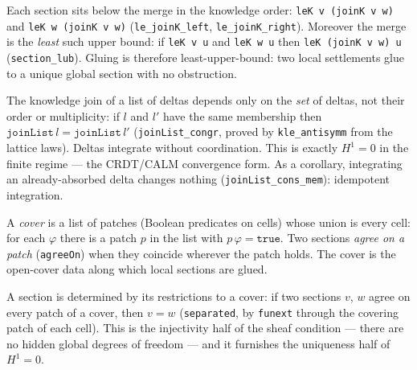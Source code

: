 \begin{lemma}\label{thm:section-lub}\leanok{}
Each section sits below the merge in the knowledge order: \texttt{leK v (joinK v w)} and \texttt{leK w (joinK v w)} (\texttt{le\_joinK\_left}, \texttt{le\_joinK\_right}). Moreover the merge is the \emph{least} such upper bound: if \texttt{leK v u} and \texttt{leK w u} then \texttt{leK (joinK v w) u} (\texttt{section\_lub}). Gluing is therefore least-upper-bound: two local settlements glue to a unique global section with no obstruction.
\end{lemma}

\begin{theorem}\label{def:vanishing-h1-crdt}\leanok{}
The knowledge join of a list of deltas depends only on the \emph{set} of deltas, not their order or multiplicity: if $l$ and $l'$ have the same membership then $\texttt{joinList}\,l = \texttt{joinList}\,l'$ (\texttt{joinList\_congr}, proved by \texttt{kle\_antisymm} from the lattice laws). Deltas integrate without coordination. This is exactly $H^1 = 0$ in the finite regime --- the CRDT/CALM convergence form. As a corollary, integrating an already-absorbed delta changes nothing (\texttt{joinList\_cons\_mem}): idempotent integration.
\end{theorem}

\begin{definition}\label{def:sheaf-cover}\leanok{}
A \emph{cover} is a list of patches (Boolean predicates on cells) whose union is every cell: for each $\varphi$ there is a patch $p$ in the list with $p\,\varphi = \texttt{true}$. Two sections \emph{agree on a patch} (\texttt{agreeOn}) when they coincide wherever the patch holds. The cover is the open-cover data along which local sections are glued.
\end{definition}

\begin{theorem}\label{thm:sheaf-separated}\leanok{}
A section is determined by its restrictions to a cover: if two sections $v$, $w$ agree on every patch of a cover, then $v = w$ (\texttt{separated}, by \texttt{funext} through the covering patch of each cell). This is the injectivity half of the sheaf condition --- there are no hidden global degrees of freedom --- and it furnishes the uniqueness half of $H^1 = 0$.
\end{theorem}

